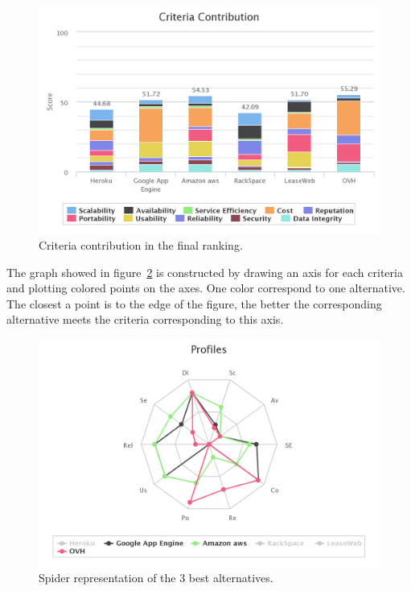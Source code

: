 \documentclass[a4paper,11pt]{article}
\begin{document}
\begin{figure}[h]
  \center
  \includegraphics[width=\textwidth-5cm]{img/Result/criteria_contribution.png}
  \caption{Criteria contribution in the final ranking.}
  \label{fig:contrib}
\end{figure}

The graph showed in figure~\ref{fig:spider} is constructed by drawing an axis for each criteria and plotting colored points on the axes. One color correspond to one alternative. The closest a point is to the edge of the figure, the better the corresponding alternative meets the criteria corresponding to this axis.\\

\begin{figure}
\centering
  \includegraphics[width=\textwidth-2cm]{img/Result/spider_web-3best.png}
\caption{\og Spider \fg{} representation of the 3 best alternatives.}
  \label{fig:spider}
\end{figure}
\end{document}
